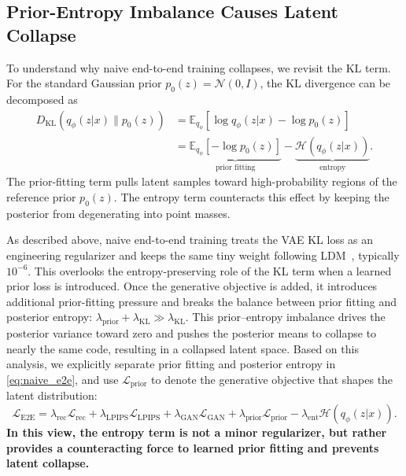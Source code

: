 \documentclass[]{bytedance_seed}
\begin{document}
\subsection{Prior-Entropy Imbalance Causes Latent Collapse}
\label{subsec:prior_entropy}
To understand why naive end-to-end training collapses, we revisit the KL term.
For the standard Gaussian prior $p_0(z)=\mathcal{N}(0,I)$, the KL divergence can be decomposed as
\begin{align}
    D_{\mathrm{KL}}(q_\phi(z|x)\|p_0(z))
    &=
    \mathbb{E}_{q_\phi}
    [\log q_\phi(z|x)-\log p_0(z)] \\
    &=
    \underbrace{
    \mathbb{E}_{q_\phi}[-\log p_0(z)]
    }_{\text{prior fitting}}
    -
    \underbrace{
    \mathcal{H}(q_\phi(z|x))
    }_{\text{entropy}}.
\end{align}
The prior-fitting term pulls latent samples toward high-probability regions of the reference prior $p_0(z)$.
The entropy term counteracts this effect by keeping the posterior from degenerating into point masses.

As described above, naive end-to-end training treats the VAE KL loss as an engineering regularizer and keeps the same tiny weight following LDM~\cite{ldm}, typically $10^{-6}$. 
This overlooks the entropy-preserving role of the KL term when a learned prior loss is introduced.
Once the generative objective is added, it introduces additional prior-fitting pressure and breaks the balance between prior fitting and posterior entropy: $\lambda_{\mathrm{prior}}+\lambda_{\mathrm{KL}}\gg\lambda_{\mathrm{KL}}$. 
This prior--entropy imbalance drives the posterior variance toward zero and pushes the posterior means to collapse to nearly the same code, resulting in a collapsed latent space.
Based on this analysis, we explicitly separate prior fitting and posterior entropy in \cref{eq:naive_e2e}, and use $\mathcal{L}_{\mathrm{prior}}$ to denote the generative objective that shapes the latent distribution:
\begin{equation}
    \mathcal{L}_{\mathrm{E2E}}
    =
    \lambda_{\mathrm{rec}}\mathcal{L}_{\mathrm{rec}}
    +
    \lambda_{\mathrm{LPIPS}}\mathcal{L}_{\mathrm{LPIPS}}
    +
    \lambda_{\mathrm{GAN}}\mathcal{L}_{\mathrm{GAN}}
    +
    \lambda_{\mathrm{prior}}\mathcal{L}_{\mathrm{prior}}
    -
    \lambda_{\mathrm{ent}}\mathcal{H}(q_\phi(z|x)).
    \label{eq:e2e_objective}
\end{equation}
\textbf{In this view, the entropy term is not a minor regularizer, but rather provides a counteracting force to learned prior fitting and prevents latent collapse.}
\end{document}
